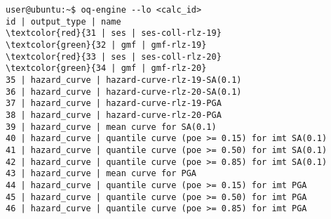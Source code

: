 \begin{Verbatim}[frame=single, commandchars=\\\{\}, fontsize=\small]
user@ubuntu:~$ oq-engine --lo <calc_id>
id | output_type | name
\textcolor{red}{31 | ses | ses-coll-rlz-19}
\textcolor{green}{32 | gmf | gmf-rlz-19}
\textcolor{red}{33 | ses | ses-coll-rlz-20}
\textcolor{green}{34 | gmf | gmf-rlz-20}
35 | hazard_curve | hazard-curve-rlz-19-SA(0.1)
36 | hazard_curve | hazard-curve-rlz-20-SA(0.1)
37 | hazard_curve | hazard-curve-rlz-19-PGA
38 | hazard_curve | hazard-curve-rlz-20-PGA
39 | hazard_curve | mean curve for SA(0.1)
40 | hazard_curve | quantile curve (poe >= 0.15) for imt SA(0.1)
41 | hazard_curve | quantile curve (poe >= 0.50) for imt SA(0.1)
42 | hazard_curve | quantile curve (poe >= 0.85) for imt SA(0.1)
43 | hazard_curve | mean curve for PGA
44 | hazard_curve | quantile curve (poe >= 0.15) for imt PGA
45 | hazard_curve | quantile curve (poe >= 0.50) for imt PGA
46 | hazard_curve | quantile curve (poe >= 0.85) for imt PGA
\end{Verbatim}